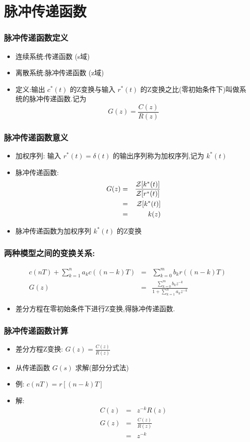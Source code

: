 \documentclass[table]{beamer}
\begin{document}
\section{脉冲传递函数}
\label{sec-2}
\begin{frame}
\frametitle{脉冲传递函数定义}
\label{sec-2-1}

\begin{itemize}
\item 连续系统:传递函数 (s域)
\item 离散系统:脉冲传递函数 (z域)
\item <2->定义:输出  $c^*(t)$   的Z变换与输入  $r^*(t)$  的Z变换之比(零初始条件下)叫做系统的脉冲传递函数.记为 
        \[G(z)=\frac{C(z)}{R(z)}\]
\end{itemize}
\end{frame}
\begin{frame}
\frametitle{脉冲传递函数意义}
\label{sec-2-2}

\begin{itemize}
\item 加权序列: 输入  $r^*(t)=\delta(t)$  的输出序列称为加权序列,记为  $k^*(t)$
\item <2->脉冲传递函数: 
     \begin{eqnarray*}
     G(z) &=& \frac{{\cal Z}[k^*(t)]}{{\cal Z}[r^*(t)]} \\
     &=& {\cal Z}[k^*(t)]\\
     &=& k(z)
     \end{eqnarray*}
\item <3-> 脉冲传递函数为加权序列  $k^*(t)$  的Z变换
\end{itemize}
\end{frame}
\begin{frame}
\frametitle{两种模型之间的变换关系:}
\label{sec-2-3}

     \begin{eqnarray*}
     c(nT)+\sum_{k=1}^n a_k c((n-k)T) &=& \sum_{k=0}^m b_k r((n-k)T) \\
     G(z) &=& \frac{\sum_{k=0}^{m}b_k z^{-k}}{1+\sum_{k=1}^n a_k z^{-k}}
     \end{eqnarray*}
\begin{itemize}
\item <2-> 差分方程在零初始条件下进行Z变换,得脉冲传递函数.
\end{itemize}
\end{frame}
\begin{frame}
\frametitle{脉冲传递函数计算}
\label{sec-2-4}

\begin{itemize}
\item 差分方程Z变换:  $G(z)=\frac{C(z)}{R(z)}$
\item 从传递函数  $G(s)$  求解(部分分式法)
\item <2->例:  $c(nT)=r[(n-k)T]$
\item <3->解:
      \begin{eqnarray*}
      C(z) &=& z^{-k}R(z) \\
      G(z) &=& \frac{C(z)}{R(z)} \\
        &=& z^{-k}
      \end{eqnarray*}
\end{itemize}
\end{frame}
\end{document}

